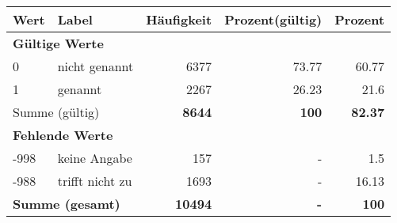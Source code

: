      \begin{longtable}{lXrrr}
     \toprule
     \textbf{Wert} & \textbf{Label} & \textbf{Häufigkeit} & \textbf{Prozent(gültig)} & \textbf{Prozent} \\
     \endhead
     \midrule
     \multicolumn{5}{l}{\textbf{Gültige Werte}}\\

     0 &
     \multicolumn{1}{X}{ nicht genannt   } &


       \num{6377} &
       \num[round-mode=places,round-precision=2]{73.77} &
         \num[round-mode=places,round-precision=2]{60.77} \\

     1 &
     \multicolumn{1}{X}{ genannt   } &


       \num{2267} &
       \num[round-mode=places,round-precision=2]{26.23} &
         \num[round-mode=places,round-precision=2]{21.6} \\
     \midrule
     \multicolumn{2}{l}{Summe (gültig)} &
       \textbf{\num{8644}} &
     \textbf{\num{100}} &
       \textbf{\num[round-mode=places,round-precision=2]{82.37}} \\
     \multicolumn{5}{l}{\textbf{Fehlende Werte}}\\
       -998 &
       keine Angabe &
         \num{157} &
        - &
         \num[round-mode=places,round-precision=2]{1.5} \\
       -988 &
       trifft nicht zu &
         \num{1693} &
        - &
         \num[round-mode=places,round-precision=2]{16.13} \\
     \midrule
     \multicolumn{2}{l}{\textbf{Summe (gesamt)}} &
          \textbf{\num{10494}} &
        \textbf{-} &
        \textbf{\num{100}} \\
     \bottomrule
     \end{longtable}
     
